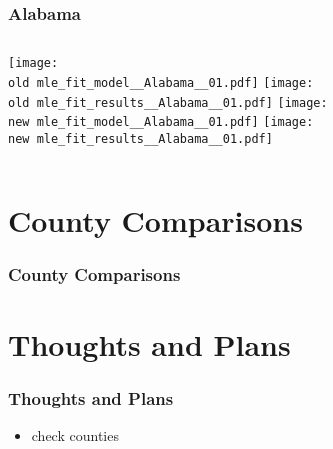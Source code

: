 \documentclass{beamer}
\newcommand{\old}{current_two_stage_output/pyseir/state_summaries/reports/}
\newcommand{\new}{new_shortest_t_delta/pyseir/state_summaries/reports/}
\begin{document}
\begin{frame}
\frametitle{Alabama}
    \begin{columns}[t]
       \texttt{[image: \\old mle\_fit\_model\_\_Alabama\_\_01.pdf]}
       \texttt{[image: \\old mle\_fit\_results\_\_Alabama\_\_01.pdf]}   
       \texttt{[image: \\new mle\_fit\_model\_\_Alabama\_\_01.pdf]}
       \texttt{[image: \\new mle\_fit\_results\_\_Alabama\_\_01.pdf]}   
\end{columns}
\end{frame}


\section{County Comparisons}
\begin{frame}
\begin{center}
\frametitle{County Comparisons}
\end{center}
\end{frame}
\section{Thoughts and Plans} %
\begin{frame}
\frametitle{Thoughts and Plans}
\begin{itemize}[label={-}]

\item check counties

\end{itemize}
\end{frame}
\end{document}
